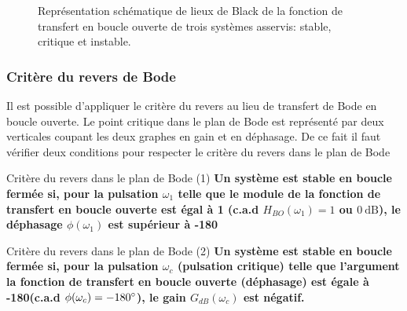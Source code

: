 \begin{figure}[!h]
\begin{center}
\end{center}
\caption{Représentation schématique de lieux de Black de la 
    fonction de transfert en boucle ouverte de trois systèmes 
    asservis: stable, critique et instable.
\label{fig-black_revers}}
\end{figure}
\subsubsection{Critère du revers de Bode}

Il est possible d'appliquer le critère du revers au lieu de transfert de Bode
en boucle ouverte. Le point critique
dans le plan de Bode est représenté par deux verticales coupant les deux graphes en gain et en déphasage.
De ce fait il faut vérifier deux conditions pour respecter le critère du revers dans le plan de Bode

\begin{criteria}{Critère du revers dans le plan de Bode (1)}
\textbf{Un système est stable en boucle fermée si, pour la pulsation $\omega_{1}$ telle que le module 
    de la fonction de transfert en boucle ouverte est égal à 1 (c.a.d $H_{BO}(\omega_{1})=1$ 
    ou $\SI{0}{\dB}$), le déphasage $\phi(\omega_1)$ est supérieur à -180\degree}
\end{criteria}

\begin{criteria}{Critère du revers dans le plan de Bode (2)}
    \textbf{Un système est stable en boucle fermée si, pour la pulsation $\omega_{c}$ (pulsation critique)
    telle que l'argument la fonction de transfert en boucle ouverte (déphasage) est 
    égale à -180\degree (c.a.d $\phi(\omega_c)=-180\degree$), le gain $G_{dB}(\omega_c)$ est négatif.}
\end{criteria}


